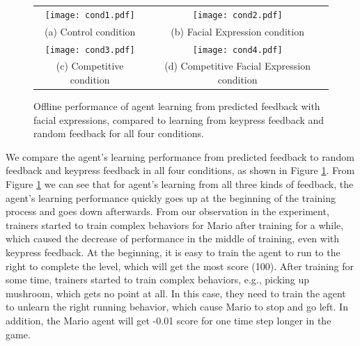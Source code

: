 \begin{figure}[htb]
\centering
\begin{tabular}{c c}
\texttt{[image: cond1.pdf]} &
\texttt{[image: cond2.pdf]} \\
(a) Control condition & (b) Facial Expression condition \\
\texttt{[image: cond3.pdf]} &
\texttt{[image: cond4.pdf]}\\
(c) Competitive condition & (d) Competitive Facial Expression condition
\end{tabular}
\caption{Offline performance of agent learning from predicted feedback with facial expressions, compared to learning from keypress feedback and random feedback for all four conditions. }%
\label{learning_from_predicted}
\end{figure}


We compare the agent's learning performance from predicted feedback to random feedback and keypress feedback in all four conditions, as shown in Figure \ref{learning_from_predicted}. From Figure \ref{learning_from_predicted} we can see that for agent's learning from all three kinds of feedback, the agent's learning performance quickly goes up at the beginning of the training process and goes down afterwards. From our observation in the experiment, trainers started to train complex behaviors for Mario after training for a while, which caused the decrease of performance in the middle of training, even with keypress feedback. At the beginning, it is easy to train the agent to run to the right to complete the level, which will get the most score (100). After training for some time, trainers started to train complex behaviors, e.g., picking up mushroom, which gets no point at all. In this case, they need to train the agent to unlearn the right running behavior, which cause Mario to stop and go left. In addition, the Mario agent will get -0.01 score for one time step longer in the game. %

